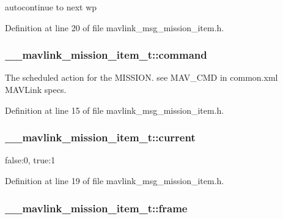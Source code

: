 autocontinue to next wp 



Definition at line 20 of file mavlink\-\_\-msg\-\_\-mission\-\_\-item.\-h.

\hypertarget{struct____mavlink__mission__item__t_ad5a94a67caa147049e45c3754f15daa7}{
\subsubsection[{command}]{ \-\_\-\-\_\-mavlink\-\_\-mission\-\_\-item\-\_\-t\-::command}}\label{struct____mavlink__mission__item__t_ad5a94a67caa147049e45c3754f15daa7}


The scheduled action for the M\-I\-S\-S\-I\-O\-N. see M\-A\-V\-\_\-\-C\-M\-D in common.\-xml M\-A\-V\-Link specs. 



Definition at line 15 of file mavlink\-\_\-msg\-\_\-mission\-\_\-item.\-h.

\hypertarget{struct____mavlink__mission__item__t_aa9fdaa647214fcb6bb21e05f2718f56f}{
\subsubsection[{current}]{ \-\_\-\-\_\-mavlink\-\_\-mission\-\_\-item\-\_\-t\-::current}}\label{struct____mavlink__mission__item__t_aa9fdaa647214fcb6bb21e05f2718f56f}


false\-:0, true\-:1 



Definition at line 19 of file mavlink\-\_\-msg\-\_\-mission\-\_\-item.\-h.

\hypertarget{struct____mavlink__mission__item__t_aa3b25a65ef4d62f208ea6d3856b418cb}{
\subsubsection[{frame}]{ \-\_\-\-\_\-mavlink\-\_\-mission\-\_\-item\-\_\-t\-::frame}}\label{struct____mavlink__mission__item__t_aa3b25a65ef4d62f208ea6d3856b418cb}


